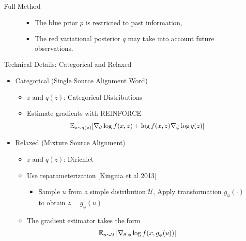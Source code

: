 \begin{frame}{Full Method}
\begin{figure}


  \begin{itemize}
  \item  The blue prior $p$ is restricted to past information,
  \item  The red variational posterior $q$ may take into account future observations.
  \end{itemize}
\end{figure}
\end{frame}


\begin{frame}{Technical Details: Categorical and Relaxed}
\begin{itemize}
    \item Categorical (Single Source Alignment Word)
    \begin{itemize}
        \item $z$ and $q(z)$: Categorical Distributions
        \item Estimate gradients with REINFORCE
        \[ \mathbb{E}_{z \sim q(z)} [\nabla_\theta\log f(x,z) + \log f(x,z)\nabla_\phi \log q(z) ] \]
    \end{itemize}
    \pause

    \item Relaxed (Mixture Source Alignment)
    \begin{itemize}
        \item $z$ and $q(z)$: Dirichlet
        \item Use reparameterization {\small[Kingma et al 2013]}
            \begin{itemize}
            \item Sample $u$ from a simple distribution $\mathcal{U}$, Apply transformation $g_{\phi}(\cdot)$ to obtain $z=g_{\phi}(u)$
            \end{itemize}
        \item The gradient estimator takes the form
            \[ \mathbb{E}_{u \sim \mathcal{U}} \left[\nabla_{\theta,\phi} \log f(x,g_\phi(u))\right ]\]
    \end{itemize}
\end{itemize}
\end{frame}


